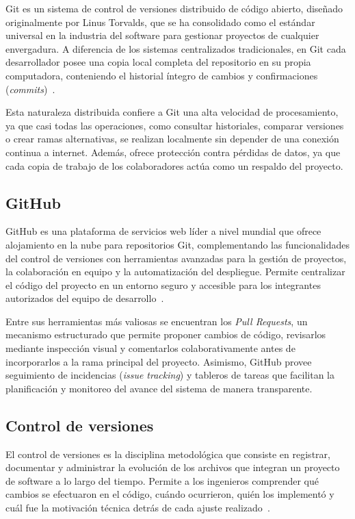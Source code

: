 Git es un sistema de control de versiones distribuido de código abierto, diseñado originalmente por Linus Torvalds, que se ha consolidado como el estándar universal en la industria del software para gestionar proyectos de cualquier envergadura. A diferencia de los sistemas centralizados tradicionales, en Git cada desarrollador posee una copia local completa del repositorio en su propia computadora, conteniendo el historial íntegro de cambios y confirmaciones (\textit{commits})~\cite{git_doc}.

Esta naturaleza distribuida confiere a Git una alta velocidad de procesamiento, ya que casi todas las operaciones, como consultar historiales, comparar versiones o crear ramas alternativas, se realizan localmente sin depender de una conexión continua a internet. Además, ofrece protección contra pérdidas de datos, ya que cada copia de trabajo de los colaboradores actúa como un respaldo del proyecto.

\subsection{GitHub}

GitHub es una plataforma de servicios web líder a nivel mundial que ofrece alojamiento en la nube para repositorios Git, complementando las funcionalidades del control de versiones con herramientas avanzadas para la gestión de proyectos, la colaboración en equipo y la automatización del despliegue. Permite centralizar el código del proyecto en un entorno seguro y accesible para los integrantes autorizados del equipo de desarrollo~\cite{github_repos}.

Entre sus herramientas más valiosas se encuentran los \textit{Pull Requests}, un mecanismo estructurado que permite proponer cambios de código, revisarlos mediante inspección visual y comentarlos colaborativamente antes de incorporarlos a la rama principal del proyecto. Asimismo, GitHub provee seguimiento de incidencias (\textit{issue tracking}) y tableros de tareas que facilitan la planificación y monitoreo del avance del sistema de manera transparente.

\subsection{Control de versiones}

El control de versiones es la disciplina metodológica que consiste en registrar, documentar y administrar la evolución de los archivos que integran un proyecto de software a lo largo del tiempo. Permite a los ingenieros comprender qué cambios se efectuaron en el código, cuándo ocurrieron, quién los implementó y cuál fue la motivación técnica detrás de cada ajuste realizado~\cite{git_doc}.

